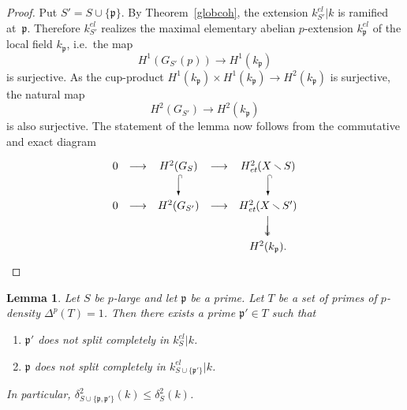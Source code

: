 \documentclass[10pt]{article}
\def\mapr#1{\stackrel{#1}{\longrightarrow}}
\def\surjd#1{\lower4pt\hbox{$\downarrow$}\kern-5.65pt\Big\downarrow\rlap {$\vcenter{\hbox{$\scriptstyle{{#1}}$}}$}}
\def\injd#1{
 \setlength{\unitlength}{0.1pt}
 \begin{picture}(40,120)
 \put(20,102){\vector(0,-1){158}} \put(12.5,100){\mbox{$\scriptscriptstyle
 \cap $}} \put(47,10){\mbox{$\scriptstyle #1 $}}
 \end{picture}}
\newcommand{\p}{{\mathfrak p}}
\newcommand{\sm}{{\,\smallsetminus\,}}
\newcommand{\et}{\text{\it et}}
\theoremstyle{alex}
\newtheorem{lemma}[theorem]{Lemma}
\theoremstyle{alexdef}
\begin{document}
\begin{proof}
Put $S'=S\cup \{\p\}$. By Theorem~\ref{globcoh}, the extension $k_{S'}^{el}|k$ is ramified at~$\p$. Therefore $k_{S'}^{el}$ realizes the maximal elementary abelian $p$-extension $k_\p^{el}$ of the local field $k_\p$, i.e.\ the map
\[
H^1(G_{S'}(p)) \longrightarrow H^1(k_\p)
\]
is surjective. As the cup-product $H^1(k_\p)\times H^1(k_\p) \to H^2(k_\p)$ is surjective, the natural map
\[
H^2(G_{S'}) \mapr{} H^2(k_\p)
\]
is also surjective. The statement of the lemma now follows from the commutative and exact diagram
\[
\renewcommand{\arraystretch}{1.5}
\begin{array}{ccccc}
0&\mapr{}& H^2(G_S)&\mapr{}& H^2_\et(X\sm S)\\
&&\injd{}&&\injd{}\\
0&\mapr{}& H^2(G_{S'})&\mapr{}& H^2_\et(X\sm S')\\
&&&&\surjd{}\\
&&&&H^2(k_\p).\\
\end{array}
\renewcommand{\arraystretch}{1}
\]
\end{proof}

\begin{lemma} \label{einsdazu1}
Let $S$ be $p$-large and let $\p$ be a prime. Let $T$ be a set of primes of $p$-density $\varDelta^p(T)=1$. Then there exists a prime $\p' \in T$ such that
\begin{enumerate}
\item[\rm (i)] $\p'$ does not split completely in $k_S^{el}|k$.
\item[\rm (ii)] $\p$ does not split completely in $k_{S\cup \{\p'\}}^{el}|k$.
\end{enumerate}
In particular, $\delta^2_{S\cup \{\p,\p'\}}(k)\leq \delta^2_S(k)$.
\end{lemma}
\end{document}
